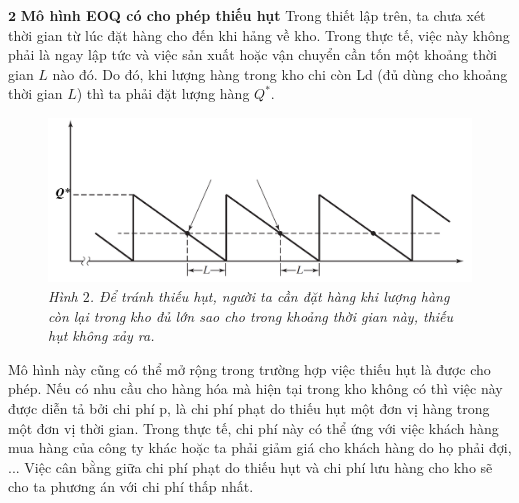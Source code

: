 \begin{multicols}{2}
\begin{figure}[H]
		\vspace*{-10pt}
	\end{figure}
	\vskip 0.1cm
	$\pmb{2}$ \textbf{Mô hình EOQ có cho phép thiếu hụt}
	\vskip 0.1cm
	Trong thiết lập trên, ta chưa xét thời gian từ lúc đặt hàng cho đến khi hảng về kho. Trong thực tế, việc này không phải là ngay lập tức và việc sản xuất hoặc vận chuyển cần tốn một khoảng thời gian $L$ nào đó. Do đó, khi lượng hàng trong kho chi còn Ld (đủ dùng cho khoảng thời gian $L$) thì ta phải đặt lượng hàng $Q^*$.
	\begin{figure}[H]
		\vspace*{-5pt}
		\centering
		\captionsetup{labelformat= empty, justification=centering}
		\includegraphics[width= 1\linewidth]{3}
		\caption{\small\textit{\color{toanhocdoisong}Hình $2$. Để tránh thiếu hụt, người ta cần đặt hàng khi lượng hàng còn lại trong kho đủ lớn sao cho trong khoảng thời gian này, thiếu hụt không xảy ra.}}
		\vspace*{-10pt}
	\end{figure}
	Mô hình này cũng có thể mở rộng trong trường hợp việc thiếu hụt là được cho phép. Nếu có nhu cầu cho hàng hóa mà hiện tại trong kho không có thì việc này được diễn tả bởi chi phí p, là chi phí phạt do thiếu hụt một đơn vị hàng trong một đơn vị thời gian. Trong thực tế, chi phí này có thể ứng với việc khách hàng mua hàng của công ty khác hoặc ta phải giảm giá cho khách hàng do họ phải đợi, ... Việc cân bằng giữa chi phí phạt do thiếu hụt và chi phí lưu hàng cho kho sẽ cho ta phương án với chi phí thấp nhất.

\end{multicols}
